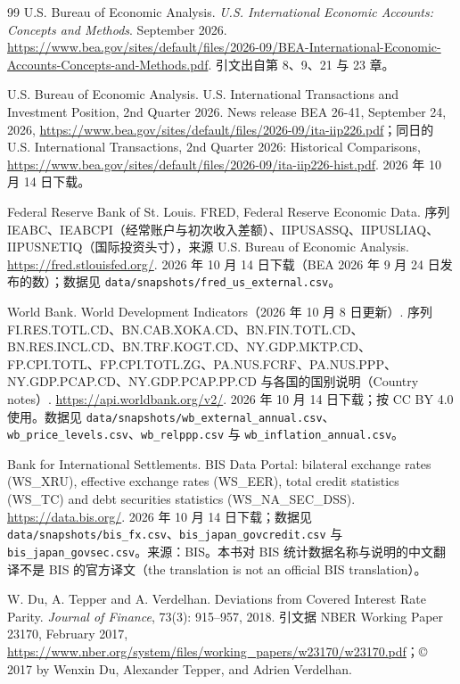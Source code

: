 \begin{thebibliography}{99}
 U.S. Bureau of Economic Analysis. \emph{U.S. International Economic Accounts: Concepts and Methods}. September 2026. \url{https://www.bea.gov/sites/default/files/2026-09/BEA-International-Economic-Accounts-Concepts-and-Methods.pdf}. 引文出自第 8、9、21 与 23 章。

 U.S. Bureau of Economic Analysis. U.S. International Transactions and Investment Position, 2nd Quarter 2026. News release BEA 26-41, September 24, 2026, \url{https://www.bea.gov/sites/default/files/2026-09/ita-iip226.pdf}；同日的 U.S. International Transactions, 2nd Quarter 2026: Historical Comparisons, \url{https://www.bea.gov/sites/default/files/2026-09/ita-iip226-hist.pdf}. 2026 年 10 月 14 日下载。

 Federal Reserve Bank of St. Louis. FRED, Federal Reserve Economic Data. 序列 IEABC、IEABCPI（经常账户与初次收入差额）、IIPUSASSQ、IIPUSLIAQ、IIPUSNETIQ（国际投资头寸），来源 U.S. Bureau of Economic Analysis. \url{https://fred.stlouisfed.org/}. 2026 年 10 月 14 日下载（BEA 2026 年 9 月 24 日发布的数）；数据见 \texttt{data/snapshots/fred\_us\_external.csv}。

 World Bank. World Development Indicators（2026 年 10 月 8 日更新）. 序列 FI.RES.TOTL.CD、BN.CAB.XOKA.CD、BN.FIN.TOTL.CD、BN.RES.INCL.CD、BN.TRF.KOGT.CD、NY.GDP.MKTP.CD、FP.CPI.TOTL、FP.CPI.TOTL.ZG、PA.NUS.FCRF、PA.NUS.PPP、NY.GDP.PCAP.CD、NY.GDP.PCAP.PP.CD 与各国的国别说明（Country notes）. \url{https://api.worldbank.org/v2/}. 2026 年 10 月 14 日下载；按 CC BY 4.0 使用。数据见 \texttt{data/snapshots/wb\_external\_annual.csv}、\texttt{wb\_price\_levels.csv}、\texttt{wb\_relppp.csv} 与 \texttt{wb\_inflation\_annual.csv}。

 Bank for International Settlements. BIS Data Portal: bilateral exchange rates (WS\_XRU), effective exchange rates (WS\_EER), total credit statistics (WS\_TC) and debt securities statistics (WS\_NA\_SEC\_DSS). \url{https://data.bis.org/}. 2026 年 10 月 14 日下载；数据见 \texttt{data/snapshots/bis\_fx.csv}、\texttt{bis\_japan\_govcredit.csv} 与 \texttt{bis\_japan\_govsec.csv}。来源：BIS。本书对 BIS 统计数据名称与说明的中文翻译不是 BIS 的官方译文（the translation is not an official BIS translation）。

 W. Du, A. Tepper and A. Verdelhan. Deviations from Covered Interest Rate Parity. \emph{Journal of Finance}, 73(3): 915--957, 2018. 引文据 NBER Working Paper 23170, February 2017, \url{https://www.nber.org/system/files/working_papers/w23170/w23170.pdf}；© 2017 by Wenxin Du, Alexander Tepper, and Adrien Verdelhan.


\end{thebibliography}
